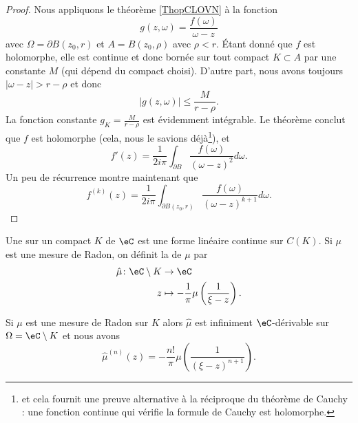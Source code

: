 \begin{proof}
    Nous appliquons le théorème \ref{ThopCLOVN} à la fonction
    \begin{equation}
        g(z,\omega)=\frac{ f(\omega) }{ \omega-z }
    \end{equation}
    avec \( \Omega=\partial B(z_0,r)\) et \( A=B(z_0,\rho)\) avec \( \rho<r\). Étant donné que \( f\) est holomorphe, elle est continue et donc bornée sur tout compact \( K\subset A\) par une constante \( M\) (qui dépend du compact choisi).  D'autre part, nous avons toujours \( | \omega-z |>r-\rho\) et donc
    \begin{equation}
        | g(z,\omega) |\leq \frac{ M }{ r-\rho }.
    \end{equation}
    La fonction constante \( g_K=\frac{ M }{ r-\rho }\) est évidemment intégrable. Le théorème conclut que \( f\) est holomorphe (cela, nous le savions déjà\footnote{et cela fournit une preuve alternative à la réciproque du théorème de Cauchy : une fonction continue qui vérifie la formule de Cauchy est holomorphe.}), et
    \begin{equation}
        f'(z)=\frac{1}{ 2i\pi }\int_{\partial B}\frac{ f(\omega) }{ (\omega-z)^2 }d\omega.
    \end{equation}
    Un peu de récurrence montre maintenant que
    \begin{equation}
        f^{(k)}(z)=\frac{1}{ 2i\pi }\int_{\partial B(z_0,r)}\frac{ f(\omega) }{ (\omega-z)^{k+1} }d\omega.
    \end{equation}
\end{proof}

\begin{definition}
    Une  sur un compact \(  K\) de \( \eC\) est une forme linéaire continue sur \( C(K)\). Si \( \mu\) est une mesure de Radon, on définit la  de \( \mu\) par 
    \begin{equation}
        \begin{aligned}
            \hat \mu\colon \eC\setminus K&\to \eC \\
            z&\mapsto -\frac{1}{ \pi }\mu\left( \frac{1}{ \xi-z } \right). 
        \end{aligned}
    \end{equation}
\end{definition}

\begin{theorem}     \label{ThoJVNTzn}
    Si \( \mu\) est une mesure de Radon sur \( K\) alors \( \hat \mu\) est infiniment \( \eC\)-dérivable sur \( \Omega=\eC\setminus K\) et nous avons
    \begin{equation}
        \hat\mu^{(n)}(z)=-\frac{ n! }{ \pi }\mu\left( \frac{1}{ (\xi-z)^{n+1} } \right).
    \end{equation}
\end{theorem}

